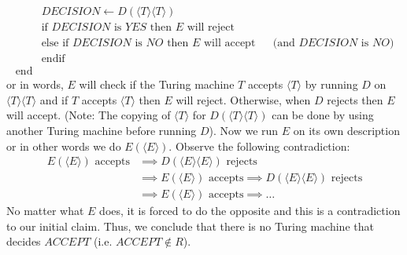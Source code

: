 \documentclass [10pt]{article}
\begin{document}
\begin{enumerate}
\begin{enumerate}
\begin{align}
			&DECISION\leftarrow D(\langle T\rangle\langle T\rangle)\nonumber\\
			&\text{if $DECISION$ is $YES$ then $E$ will reject}\nonumber\\
			&\text{else if $DECISION$ is $NO$ then $E$ will accept}&&\text{(and $DECISION$ is $NO$)}\nonumber\\
			&\text{endif}\nonumber\\
			\text{end}\nonumber
		\end{align}
		or in words, $E$ will check if the Turing machine $T$ accepts $\langle T\rangle$ by running $D$ on $\langle T\rangle\langle T\rangle$ and if $T$ accepts $\langle T\rangle$ then $E$ will reject. Otherwise, when $D$ rejects then $E$ will accept. (Note: The copying of $\langle T\rangle$ for $D(\langle T\rangle\langle T\rangle)$ can be done by using another Turing machine before running $D$). Now we run $E$ on its own description or in other words we do $E(\langle E\rangle)$. Observe the following contradiction:
		\begin{align}
			\text{$E(\langle E\rangle)$ accepts}&\implies\text{$D(\langle E\rangle\langle E\rangle)$ rejects}\nonumber\\
			&\implies\text{$E(\langle E\rangle)$ accepts}\implies\text{$D(\langle E\rangle\langle E\rangle)$ rejects}\nonumber\\
			&\implies\text{$E(\langle E\rangle)$ accepts}\implies\dots\nonumber
		\end{align}
		No matter what $E$ does, it is forced to do the opposite and this is a contradiction to our initial claim. Thus, we conclude that there is no Turing machine that decides $ACCEPT$ (i.e. $ACCEPT \notin R$).
	\end{enumerate}
\end{enumerate}
\end{document}
